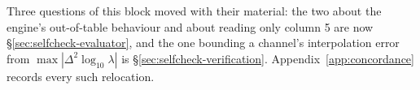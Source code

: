 \begin{aside}
Three questions of this block moved with their material: the two about the
engine's out-of-table behaviour and about reading only column 5 are now
\S\ref{sec:selfcheck-evaluator}, and the one bounding a channel's interpolation
error from $\max|\Delta^2\log_{10}\lambda|$ is
\S\ref{sec:selfcheck-verification}. Appendix~\ref{app:concordance} records every
such relocation.
\end{aside}

